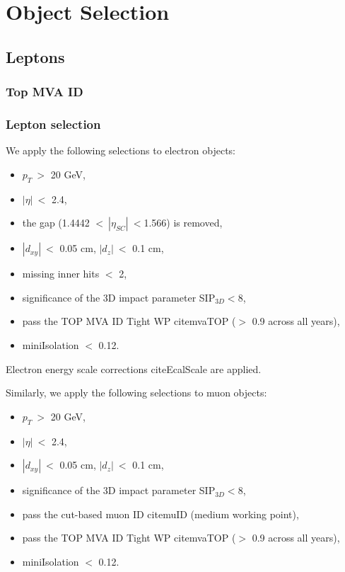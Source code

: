 \chapter{Object Selection}
\label{chap:Objects}

\section{Leptons}
\label{sec:Leptons}

\subsection{Top MVA ID}

\subsection{Lepton selection}
We apply the following selections to electron objects:

\begin{itemize}
\item $p_{T}~>$ 20 GeV,
\item $|\eta|~<$ 2.4,
\item the gap (1.4442 $<~|\eta_{SC}|~<$1.566) is removed,
\item $|d_{xy}|~<$ 0.05 cm, $|d_{z}|~<$ 0.1 cm,
\item missing inner hits $<$ 2,
\item significance of the 3D impact parameter SIP$_{3D}<$8,
\item pass the TOP MVA ID Tight WP cite{mvaTOP} ($>$ 0.9 across all years),
\item miniIsolation $<$ 0.12.
\end{itemize}

Electron energy scale corrections cite{EcalScale} are applied.

Similarly, we apply the following selections to muon objects:

\begin{itemize}
\item $p_{T}~>$ 20 GeV,
\item $|\eta|~<$ 2.4,
\item $|d_{xy}|~<$ 0.05 cm, $|d_{z}|~<$ 0.1 cm,
\item significance of the 3D impact parameter SIP$_{3D}<$8,
\item pass the cut-based muon ID cite{muID} (medium working point),
\item pass the TOP MVA ID Tight WP cite{mvaTOP} ($>$ 0.9 across all years),
\item miniIsolation $<$ 0.12.
\end{itemize}

